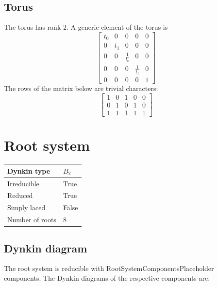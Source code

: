 \documentclass[11pt]{article}
\theoremstyle{definition}
\newif\ifrootsystemirreducible
\begin{document}
\subsection{Torus}

The torus has rank $2$. A generic element of the torus is
\[
\left[\begin{matrix}t_{0} & 0 & 0 & 0 & 0\\0 & t_{1} & 0 & 0 & 0\\0 & 0 & \frac{1}{t_{0}} & 0 & 0\\0 & 0 & 0 & \frac{1}{t_{1}} & 0\\0 & 0 & 0 & 0 & 1\end{matrix}\right]
\]
The rows of the matrix below are trivial characters:
\[
\left[\begin{matrix}1 & 0 & 1 & 0 & 0\\0 & 1 & 0 & 1 & 0\\1 & 1 & 1 & 1 & 1\end{matrix}\right]
\]

\newpage
\section{Root system}

\begin{tabular}{|l|l|}
	\hline
    Dynkin type & $B_2$ \\
	\hline
    Irreducible & True \\
	\hline
    Reduced & True \\
	\hline
	Simply laced & False \\
	\hline
	Number of roots & $8$ \\
	\hline
\end{tabular}

\subsection{Dynkin diagram}

\ifrootsystemirreducible
The root system is irreducible and has Dynkin diagram:
\else
The root system is reducible with RootSystemComponentsPlaceholder components. The Dynkin diagrams of the respective components are:
\fi

\end{document}

